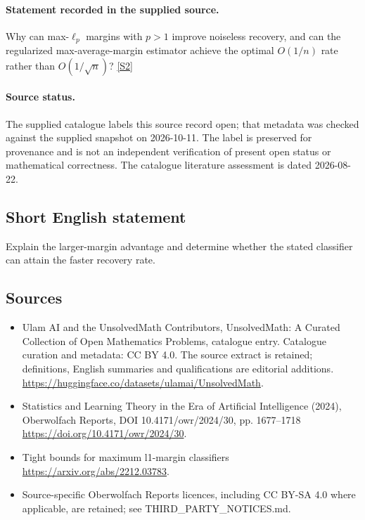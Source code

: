 \documentclass[11pt]{article}
\begin{document}
\paragraph{Statement recorded in the supplied source.}
Why can max-$\ell_p$ margins with $p>1$ improve noiseless recovery, and can the regularized max-average-margin estimator achieve the optimal $O(1/n)$ rate rather than $O(1/\sqrt n)$? \href{https://doi.org/10.4171/owr/2024/30}{[S2]}
\paragraph{Source status.}
The supplied catalogue labels this source record open; that metadata was checked against the supplied snapshot on 2026-10-11. The label is preserved for provenance and is not an independent verification of present open status or mathematical correctness. The catalogue literature assessment is dated 2026-08-22.
\subsection{Short English statement}
Explain the larger-margin advantage and determine whether the stated classifier can attain the faster recovery rate.
\subsection{Sources}
\begin{itemize}
\item[S1] Ulam AI and the UnsolvedMath Contributors, UnsolvedMath: A Curated Collection of Open Mathematics Problems, catalogue entry. Catalogue curation and metadata: CC BY 4.0. The source extract is retained; definitions, English summaries and qualifications are editorial additions.
\url{https://huggingface.co/datasets/ulamai/UnsolvedMath}.
\item[S2] Statistics and Learning Theory in the Era of Artificial Intelligence (2024), Oberwolfach Reports, DOI 10.4171/owr/2024/30, pp. 1677--1718
\url{https://doi.org/10.4171/owr/2024/30}.
\item[S3] Tight bounds for maximum l1-margin classifiers
\url{https://arxiv.org/abs/2212.03783}.
\item Source-specific Oberwolfach Reports licences, including CC BY-SA 4.0 where applicable, are retained; see THIRD\_PARTY\_NOTICES.md.
\end{itemize}
\end{document}
